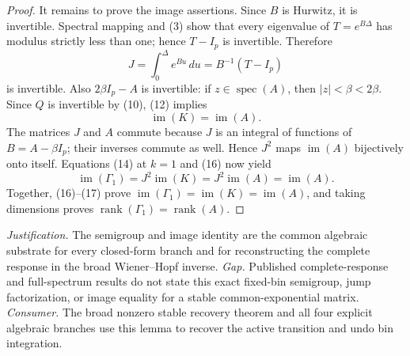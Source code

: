 \documentclass{article}
\begin{document}
\begin{proof}
It remains to prove the image assertions.  Since \(B\) is Hurwitz, it is invertible.  Spectral mapping and (3) show that every eigenvalue of \(T=e^{B\Delta}\) has modulus strictly less than one; hence \(T-I_p\) is invertible.  Therefore
\[
 J=\int_0^\Delta e^{Bu}\,du=B^{-1}(T-I_p)
\tag{15}
\]
is invertible.  Also \(2\beta I_p-A\) is invertible: if \(z\in\operatorname{spec}(A)\), then \(|z|<\beta<2\beta\).  Since \(Q\) is invertible by (10), (12) implies
\[
 \operatorname{im}(K)=\operatorname{im}(A).
\tag{16}
\]
The matrices \(J\) and \(A\) commute because \(J\) is an integral of functions of \(B=A-\beta I_p\); their inverses commute as well.  Hence \(J^2\) maps \(\operatorname{im}(A)\) bijectively onto itself.  Equations (14) at \(k=1\) and (16) now yield
\[
 \operatorname{im}(\Gamma_1)=J^2\operatorname{im}(K)
 =J^2\operatorname{im}(A)=\operatorname{im}(A).
\tag{17}
\]
Together, (16)--(17) prove \(\operatorname{im}(\Gamma_1)=\operatorname{im}(K)=\operatorname{im}(A)\), and taking dimensions proves \(\operatorname{rank}(\Gamma_1)=\operatorname{rank}(A)\).
\end{proof}
\par\smallskip\noindent \textit{Justification.} The semigroup and image identity are the common algebraic substrate for every closed-form branch and for reconstructing the complete response in the broad Wiener--Hopf inverse. \textit{Gap.} Published complete-response and full-spectrum results do not state this exact fixed-bin semigroup, jump factorization, or image equality for a stable common-exponential matrix. \textit{Consumer.} The broad nonzero stable recovery theorem and all four explicit algebraic branches use this lemma to recover the active transition and undo bin integration.
\end{document}
